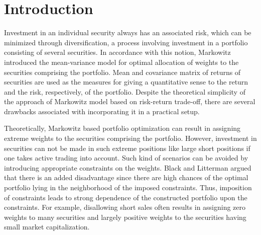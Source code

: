 \chapter{Introduction}

Investment in an individual security always has an associated risk, which can be minimized through diversification, a process involving  investment in a portfolio consisting of several securities. In accordance with this notion, Markowitz \cite{Markowitz1,Markowitz2} introduced the mean-variance model for optimal allocation of weights to the securities comprising the portfolio. Mean and covariance matrix of returns of securities are used as the measures for giving a quantitative sense to the return and the risk, respectively, of the portfolio. Despite the theoretical simplicity of the approach of Markowitz model based on risk-return trade-off, there are several drawbacks associated with incorporating it in a practical setup.

Theoretically, Markowitz based portfolio optimization can result in assigning extreme weights to the securities comprising the portfolio. However, investment in securities can not be made in such extreme positions like large short positions if one takes active trading into account. Such kind of scenarios can be avoided by introducing appropriate constraints on the weights.  Black and Litterman \cite{Black} argued that there is an added disadvantage since there are high chances of the optimal portfolio lying in the neighborhood of the imposed constraints. Thus, imposition of constraints leads to strong dependence of the constructed portfolio upon the constraints. For example, disallowing short sales often results in assigning zero weights to many securities and largely positive weights to the securities having small market capitalization. 

